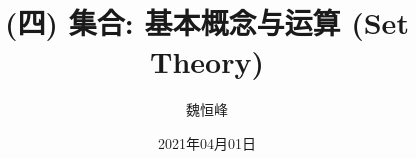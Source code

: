 \documentclass[]{beamer}
\title[(四) 集合 (Set Theory)]{(四) 集合: 基本概念与运算 (Set Theory)}
\author[魏恒峰]{\large 魏恒峰}
\institute{hfwei@nju.edu.cn}
\date{2021年04月01日}
\begin{document}
\maketitle


\thankyou{}

\end{document}
